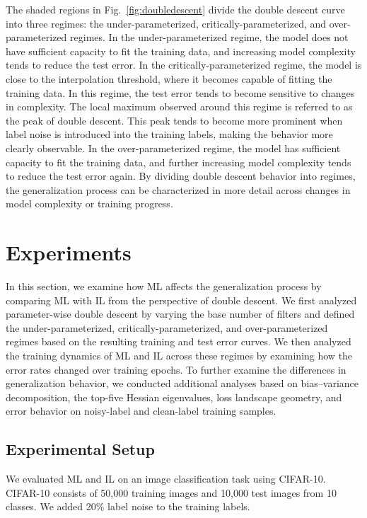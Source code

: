 \documentclass[dvipdfmx]{nolta}        %
\begin{document}
The shaded regions in Fig.~\ref{fig:doubledescent} divide the double descent curve into three regimes: the under-parameterized, critically-parameterized, and over-parameterized regimes. In the under-parameterized regime, the model does not have sufficient capacity to fit the training data, and increasing model complexity tends to reduce the test error. In the critically-parameterized regime, the model is close to the interpolation threshold, where it becomes capable of fitting the training data. In this regime, the test error tends to become sensitive to changes in complexity. The local maximum observed around this regime is referred to as the peak of double descent. This peak tends to become more prominent when label noise is introduced into the training labels, making the behavior more clearly observable. In the over-parameterized regime, the model has sufficient capacity to fit the training data, and further increasing model complexity tends to reduce the test error again. By dividing double descent behavior into regimes, the generalization process can be characterized in more detail across changes in model complexity or training progress.

\section{Experiments}
In this section, we examine how ML affects the generalization process by comparing ML with IL from the perspective of double descent. We first analyzed parameter-wise double descent by varying the base number of filters and defined the under-parameterized, critically-parameterized, and over-parameterized regimes based on the resulting training and test error curves. We then analyzed the training dynamics of ML and IL across these regimes by examining how the error rates changed over training epochs. To further examine the differences in generalization behavior, we conducted additional analyses based on bias--variance decomposition, the top-five Hessian eigenvalues, loss landscape geometry, and error behavior on noisy-label and clean-label training samples.

\subsection{Experimental Setup}
We evaluated ML and IL on an image classification task using CIFAR-10\cite{krizhevsky_learning_2009}.
CIFAR-10 consists of 50,000 training images and 10,000 test images from 10 classes.
We added 20\% label noise to the training labels.
\end{document}
